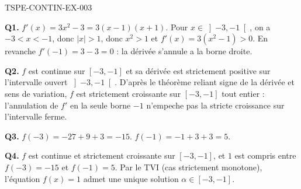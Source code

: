 \begin{corrige}{TSPE-CONTIN-EX-003}

\textbf{Q1.} $f'(x) = 3x^2 - 3 = 3(x-1)(x+1)$. Pour $x \in \left]-3,-1\right[$, on a $-3 < x < -1$, donc $|x| > 1$, donc $x^2 > 1$ et $f'(x) = 3(x^2-1) > 0$. En revanche $f'(-1) = 3 - 3 = 0$ : la dérivée s'annule a la borne droite.

\textbf{Q2.} $f$ est continue sur $[-3,-1]$ et sa dérivée est strictement positive sur l'intervalle ouvert $\left]-3,-1\right[$. D'après le théorème reliant signe de la dérivée et sens de variation, $f$ est strictement croissante sur $[-3,-1]$ tout entier : l'annulation de $f'$ en la seule borne $-1$ n'empeche pas la stricte croissance sur l'intervalle ferme.

\textbf{Q3.} $f(-3) = -27 + 9 + 3 = -15$. $f(-1) = -1 + 3 + 3 = 5$.

\textbf{Q4.} $f$ est continue et strictement croissante sur $[-3,-1]$, et $1$ est compris entre $f(-3)=-15$ et $f(-1)=5$. Par le TVI (cas strictement monotone), l'équation $f(x)=1$ admet une unique solution $\alpha \in [-3,-1]$.

\end{corrige}
